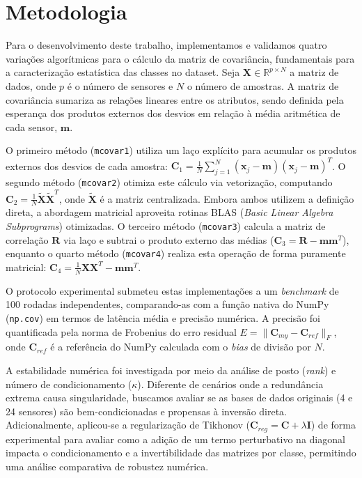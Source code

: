 \section{Metodologia}
\label{chap:metodologia}

Para o desenvolvimento deste trabalho, implementamos e validamos quatro variações algorítmicas para o cálculo da matriz de covariância, fundamentais para a caracterização estatística das classes no dataset. Seja $\mathbf{X} \in \mathbb{R}^{p \times N}$ a matriz de dados, onde $p$ é o número de sensores e $N$ o número de amostras. A matriz de covariância sumariza as relações lineares entre os atributos, sendo definida pela esperança dos produtos externos dos desvios em relação à média aritmética de cada sensor, $\mathbf{m}$.

O primeiro método (\texttt{mcovar1}) utiliza um laço explícito para acumular os produtos externos dos desvios de cada amostra: $\mathbf{C}_1 = \frac{1}{N} \sum_{j=1}^N (\mathbf{x}_j - \mathbf{m})(\mathbf{x}_j - \mathbf{m})^T$. O segundo método (\texttt{mcovar2}) otimiza este cálculo via vetorização, computando $\mathbf{C}_2 = \frac{1}{N} \tilde{\mathbf{X}} \tilde{\mathbf{X}}^T$, onde $\tilde{\mathbf{X}}$ é a matriz centralizada. Embora ambos utilizem a definição direta, a abordagem matricial aproveita rotinas BLAS (\textit{Basic Linear Algebra Subprograms}) otimizadas. O terceiro método (\texttt{mcovar3}) calcula a matriz de correlação $\mathbf{R}$ via laço e subtrai o produto externo das médias ($\mathbf{C}_3 = \mathbf{R} - \mathbf{m} \mathbf{m}^T$), enquanto o quarto método (\texttt{mcovar4}) realiza esta operação de forma puramente matricial: $\mathbf{C}_4 = \frac{1}{N} \mathbf{X} \mathbf{X}^T - \mathbf{m} \mathbf{m}^T$. 

O protocolo experimental submeteu estas implementações a um \textit{benchmark} de 100 rodadas independentes, comparando-as com a função nativa do NumPy (\texttt{np.cov}) em termos de latência média e precisão numérica. A precisão foi quantificada pela norma de Frobenius do erro residual $E = \| \mathbf{C}_{my} - \mathbf{C}_{ref} \|_F$, onde $\mathbf{C}_{ref}$ é a referência do NumPy calculada com o \textit{bias} de divisão por $N$.

A estabilidade numérica foi investigada por meio da análise de posto (\textit{rank}) e número de condicionamento ($\kappa$). Diferente de cenários onde a redundância extrema causa singularidade, buscamos avaliar se as bases de dados originais (4 e 24 sensores) são bem-condicionadas e propensas à inversão direta. Adicionalmente, aplicou-se a regularização de Tikhonov ($\mathbf{C}_{reg} = \mathbf{C} + \lambda \mathbf{I}$) de forma experimental para avaliar como a adição de um termo perturbativo na diagonal impacta o condicionamento e a invertibilidade das matrizes por classe, permitindo uma análise comparativa de robustez numérica.
